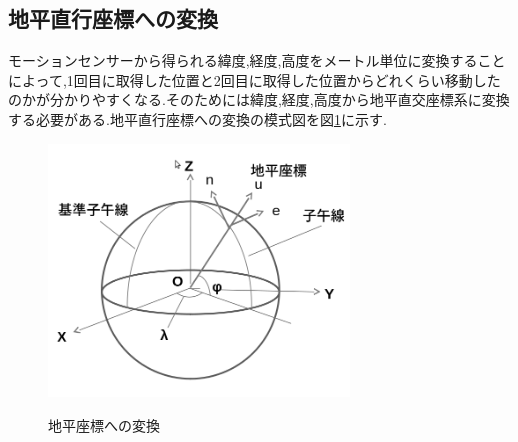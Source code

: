 \subsection{地平直行座標への変換}
モーションセンサーから得られる緯度,経度,高度をメートル単位に変換することによって,1回目に取得した位置と2回目に取得した位置からどれくらい移動したのかが分かりやすくなる.そのためには緯度,経度,高度から地平直交座標系に変換する必要がある.地平直行座標への変換の模式図を図\ref{fig:zahyou}に示す.


\begin{figure}[htp]
 \begin{center}
  \includegraphics[width=80mm]{img/soft/zahyou.png}
 　\caption{地平座標への変換}
  \label{fig:zahyou}%
 \end{center}
\end{figure}

